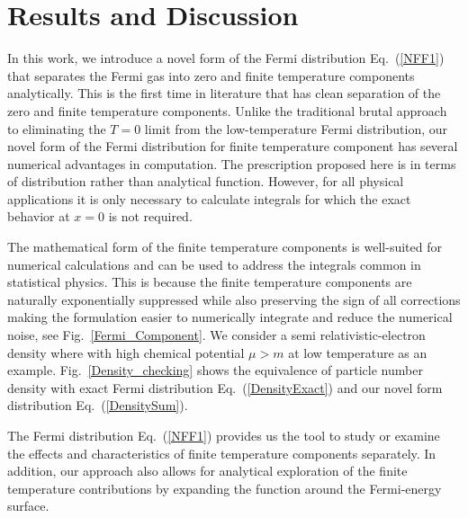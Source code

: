 \documentclass[sn-mathphys,Numbered]{sn-jnl}
\newcommand*{\xgreen}{\color{green}}
\begin{document}
\section{Results and Discussion}
\label{sec12}
In this work, we introduce a novel form of the Fermi distribution Eq.~(\ref{NFF1}) that separates the Fermi gas into zero and finite temperature components analytically. This is the first time in literature that has clean separation of the zero and finite temperature components. Unlike the traditional brutal approach to eliminating the $T=0$ limit from the low-temperature Fermi distribution, our novel form of the Fermi distribution for finite temperature component has several numerical advantages in computation. {\xgreen The prescription proposed here is in terms of distribution rather than analytical function. However, for all physical applications it is only necessary to calculate integrals for which the exact behavior at $x=0$ is not required.}

 
The mathematical form of the finite temperature components is well-suited for numerical calculations and can be used to address the integrals common in statistical physics. This is because the finite temperature components are naturally exponentially suppressed while also preserving the sign of all corrections making the formulation easier to numerically integrate and reduce the numerical noise, see Fig.~\ref{Fermi_Component}. We consider a semi relativistic-electron density where with high chemical potential $\mu>m$ at low temperature as an example. Fig.~\ref{Density_checking} shows the equivalence of particle number density with exact Fermi distribution Eq.~(\ref{DensityExact}) and our novel form  distribution Eq.~(\ref{DensitySum}). 
 
The Fermi distribution Eq.~(\ref{NFF1}) provides us the tool to study or examine the effects and characteristics of finite temperature components separately. In addition, our approach also allows for analytical exploration of the finite temperature contributions by expanding the function around the Fermi-energy surface.



\end{document}

